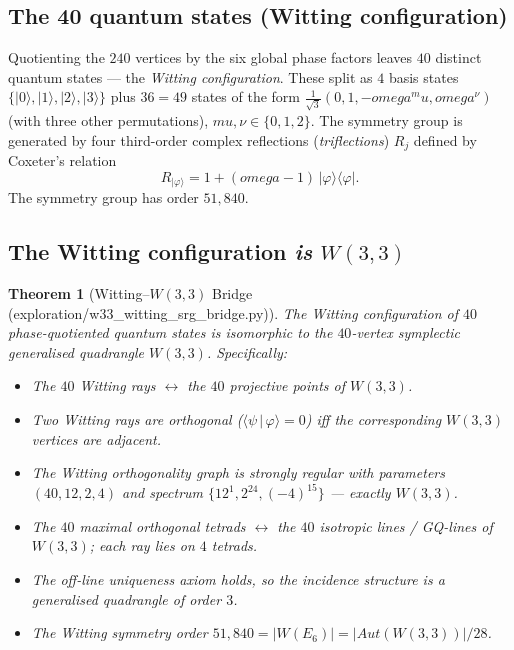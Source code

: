 \documentclass[11pt]{article}
\def\mathrm#1{#1}%
\def\mathbf#1{#1}%
\def\textbf#1{#1}%
\def\texttt#1{#1}%
\def\omega{omega}%
\def\mu{mu}%
\def\cdot{ }%
\newtheorem*{theorem}{Theorem}
\begin{document}
\subsection*{The 40 quantum states (Witting configuration)}

Quotienting the $240$ vertices by the six global phase factors leaves \textbf{$40$ distinct quantum states} --- the \emph{Witting configuration}. These split as $4$ basis states $\{|0\rangle, |1\rangle, |2\rangle, |3\rangle\}$ plus $36 = 4 \cdot 9$ states of the form $\tfrac{1}{\sqrt{3}}(0, 1, -\omega^\mu, \omega^\nu)$ (with three other permutations), $\mu, \nu \in \{0,1,2\}$. The symmetry group is generated by four \textbf{third-order complex reflections} (\emph{triflections}) $R_j$ defined by Coxeter's relation
\[
R_{|\varphi\rangle} = \mathbf{1} + (\omega - 1)\,|\varphi\rangle\langle\varphi|.
\]
The symmetry group has order $\mathbf{51{,}840}$.

\subsection*{The Witting configuration \emph{is} $W(3,3)$}

\begin{theorem}[Witting--$W(3,3)$ Bridge (\texttt{exploration/w33\_witting\_srg\_bridge.py})]
The Witting configuration of $40$ phase-quotiented quantum states is isomorphic to the $40$-vertex symplectic generalised quadrangle $W(3,3)$. Specifically:
\begin{itemize}[leftmargin=2em]
\item The $40$ Witting rays $\leftrightarrow$ the $40$ projective points of $W(3,3)$.
\item Two Witting rays are orthogonal ($\langle\psi\,|\,\varphi\rangle = 0$) iff the corresponding $W(3,3)$ vertices are adjacent.
\item The Witting orthogonality graph is strongly regular with parameters $(40, 12, 2, 4)$ and spectrum $\{12^1, 2^{24}, (-4)^{15}\}$ --- exactly $W(3,3)$.
\item The $40$ maximal orthogonal tetrads $\leftrightarrow$ the $40$ isotropic lines / GQ-lines of $W(3,3)$; each ray lies on $4$ tetrads.
\item The off-line uniqueness axiom holds, so the incidence structure is a generalised quadrangle of order $3$.
\item The Witting symmetry order $51{,}840 = |W(E_6)| = |\mathrm{Aut}(W(3,3))|/28$.
\end{itemize}
\end{theorem}
\end{document}
